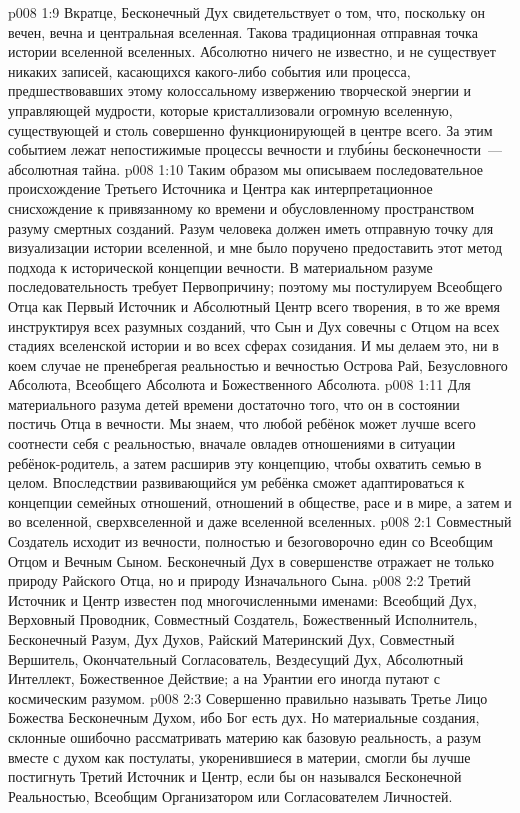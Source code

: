 \vs p008 1:9 Вкратце, Бесконечный Дух свидетельствует о том, что, поскольку он вечен, вечна и центральная вселенная. Такова традиционная отправная точка истории вселенной вселенных. Абсолютно ничего не известно, и не существует никаких записей, касающихся какого\hyp{}либо события или процесса, предшествовавших этому колоссальному извержению творческой энергии и управляющей мудрости, которые кристаллизовали огромную вселенную, существующей и столь совершенно функционирующей в центре всего. За этим событием лежат непостижимые процессы вечности и глуб\'ины бесконечности~--- абсолютная тайна.
\vs p008 1:10 \pc Таким образом мы описываем последовательное происхождение Третьего Источника и Центра как интерпретационное снисхождение к привязанному ко времени и обусловленному пространством разуму смертных созданий. Разум человека должен иметь отправную точку для визуализации истории вселенной, и мне было поручено предоставить этот метод подхода к исторической концепции вечности. В материальном разуме последовательность требует Первопричину; поэтому мы постулируем Всеобщего Отца как Первый Источник и Абсолютный Центр всего творения, в то же время инструктируя всех разумных созданий, что Сын и Дух совечны с Отцом на всех стадиях вселенской истории и во всех сферах созидания. И мы делаем это, ни в коем случае не пренебрегая реальностью и вечностью Острова Рай, Безусловного Абсолюта, Всеобщего Абсолюта и Божественного Абсолюта.
\vs p008 1:11 Для материального разума детей времени достаточно того, что он в состоянии постичь Отца в вечности. Мы знаем, что любой ребёнок может лучше всего соотнести себя с реальностью, вначале овладев отношениями в ситуации ребёнок\hyp{}родитель, а затем расширив эту концепцию, чтобы охватить семью в целом. Впоследствии развивающийся ум ребёнка сможет адаптироваться к концепции семейных отношений, отношений в обществе, расе и в мире, а затем и во вселенной, сверхвселенной и даже вселенной вселенных.
\vs p008 2:1 Совместный Создатель исходит из вечности, полностью и безоговорочно един со Всеобщим Отцом и Вечным Сыном. Бесконечный Дух в совершенстве отражает не только природу Райского Отца, но и природу Изначального Сына.
\vs p008 2:2 \pc Третий Источник и Центр известен под многочисленными именами: Всеобщий Дух, Верховный Проводник, Совместный Создатель, Божественный Исполнитель, Бесконечный Разум, Дух Духов, Райский Материнский Дух, Совместный Вершитель, Окончательный Согласователь, Вездесущий Дух, Абсолютный Интеллект, Божественное Действие; а на Урантии его иногда путают с космическим разумом.
\vs p008 2:3 Совершенно правильно называть Третье Лицо Божества Бесконечным Духом, ибо Бог есть дух. Но материальные создания, склонные ошибочно рассматривать материю как базовую реальность, а разум вместе с духом как постулаты, укоренившиеся в материи, смогли бы лучше постигнуть Третий Источник и Центр, если бы он назывался Бесконечной Реальностью, Всеобщим Организатором или Согласователем Личностей.
